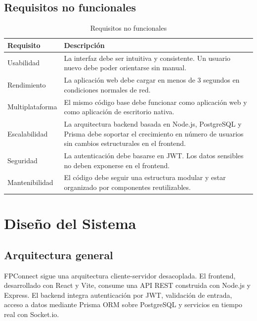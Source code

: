 \documentclass[12pt, a4paper]{report}
\begin{document}
\section{Requisitos no funcionales}

\begin{table}[H]
  \centering
  \caption{Requisitos no funcionales}
  \begin{tabularx}{\textwidth}{lX}
    \toprule
    \textbf{Requisito} & \textbf{Descripción} \\
    \midrule
    Usabilidad
      & La interfaz debe ser intuitiva y consistente. Un usuario nuevo debe poder orientarse sin
        manual. \\
    \addlinespace
    Rendimiento
      & La aplicación web debe cargar en menos de 3 segundos en condiciones normales de red. \\
    \addlinespace
    Multiplataforma
      & El mismo código base debe funcionar como aplicación web y como aplicación de escritorio
        nativa. \\
    \addlinespace
    Escalabilidad
      & La arquitectura backend basada en Node.js, PostgreSQL y Prisma debe soportar el crecimiento
        en número de usuarios sin cambios estructurales en el frontend. \\
    \addlinespace
    Seguridad
      & La autenticación debe basarse en JWT. Los datos sensibles no deben exponerse en el
        frontend. \\
    \addlinespace
    Mantenibilidad
      & El código debe seguir una estructura modular y estar organizado por componentes
        reutilizables. \\
    \bottomrule
  \end{tabularx}
\end{table}

\chapter{Diseño del Sistema}

\section{Arquitectura general}

FPConnect sigue una arquitectura cliente-servidor desacoplada. El frontend, desarrollado con React y
Vite, consume una API REST construida con Node.js y Express. El backend integra autenticación por JWT,
validación de entrada, acceso a datos mediante Prisma ORM sobre PostgreSQL y servicios en tiempo real
con Socket.io.
\end{document}
